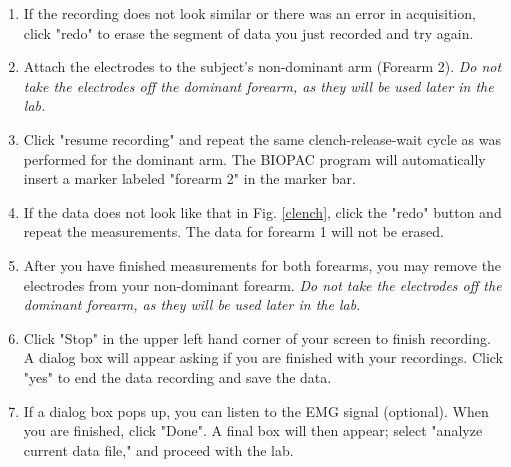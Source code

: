 \documentclass{article}
\begin{document}
\begin{enumerate}
	\item If the recording does not look similar or there was an error in acquisition, click "redo" to erase the segment of data you just recorded and try again.
	\item Attach the electrodes to the subject's non-dominant arm (Forearm 2). \textit{Do not take the electrodes off the dominant forearm, as they will be used later in the lab.}
	\item Click "resume recording" and repeat the same clench-release-wait cycle as was performed for the dominant arm. The BIOPAC program will automatically insert a marker labeled "forearm 2" in the marker bar.
	\item If the data does not look like that in Fig. \ref{clench}, click the "redo" button and repeat the measurements. The data for forearm 1 will not be erased.
	\item After you have finished measurements for both forearms, you may remove the electrodes from your non-dominant forearm. \textit{Do not take the electrodes off the dominant forearm, as they will be used later in the lab.}
	\item Click "Stop" in the upper left hand corner of your screen to finish recording. A dialog box will appear asking if you are finished with your recordings. Click "yes" to end the data recording and save the data.
	\item If a dialog box pops up, you can listen to the EMG signal (optional). When you are finished, click "Done". A final box will then appear; select "analyze current data file," and proceed with the lab.
\end{enumerate}
\end{document}
